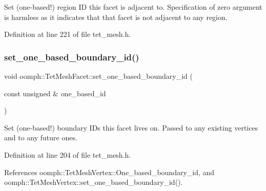 Set (one-\/based!) region ID this facet is adjacent to. Specification of zero argument is harmless as it indicates that that facet is not adjacent to any region. 



Definition at line 221 of file tet\+\_\+mesh.\+h.

\mbox{\label{classoomph_1_1TetMeshFacet_a578058c44b79c484e14be087f4f0a77f}} 
\subsubsection{\texorpdfstring{set\+\_\+one\+\_\+based\+\_\+boundary\+\_\+id()}{set\_one\_based\_boundary\_id()}}
{\footnotesize\ttfamily void oomph\+::\+Tet\+Mesh\+Facet\+::set\+\_\+one\+\_\+based\+\_\+boundary\+\_\+id (\begin{DoxyParamCaption}\item[{const unsigned \&}]{one\+\_\+based\+\_\+id }\end{DoxyParamCaption})\hspace{0.3cm}{\ttfamily [inline]}}



Set (one-\/based!) boundary I\+Ds this facet lives on. Passed to any existing vertices and to any future ones. 



Definition at line 204 of file tet\+\_\+mesh.\+h.



References oomph\+::\+Tet\+Mesh\+Vertex\+::\+One\+\_\+based\+\_\+boundary\+\_\+id, and oomph\+::\+Tet\+Mesh\+Vertex\+::set\+\_\+one\+\_\+based\+\_\+boundary\+\_\+id().

\mbox{\label{classoomph_1_1TetMeshFacet_a3b81b5e50eae3d6494d43c8e74318b93}} 
